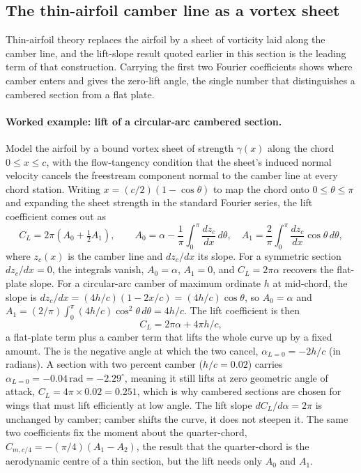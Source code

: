 \subsection{The thin-airfoil camber line as a vortex sheet}

Thin-airfoil theory replaces the airfoil by a sheet of vorticity laid
along the camber line, and the lift-slope result quoted earlier in
this section is the leading term of that construction. Carrying the
first two Fourier coefficients shows where camber enters and gives the
zero-lift angle, the single number that distinguishes a cambered
section from a flat plate.

\paragraph{Worked example: lift of a circular-arc cambered section.}
Model the airfoil by a bound vortex sheet of strength $\gamma(x)$
along the chord $0 \le x \le c$, with the flow-tangency condition that
the sheet's induced normal velocity cancels the freestream component
normal to the camber line at every chord station. Writing $x =
(c/2)(1 - \cos\theta)$ to map the chord onto $0 \le \theta \le \pi$
and expanding the sheet strength in the standard Fourier series, the
lift coefficient comes out as
\[
C_L = 2\pi\left(A_0 + \tfrac12 A_1\right),
\qquad
A_0 = \alpha - \frac{1}{\pi}\int_0^\pi \frac{dz_c}{dx}\,d\theta,
\quad
A_1 = \frac{2}{\pi}\int_0^\pi \frac{dz_c}{dx}\cos\theta\,d\theta,
\]
where $z_c(x)$ is the camber line and $dz_c/dx$ its slope. For a
symmetric section $dz_c/dx = 0$, the integrals vanish, $A_0 = \alpha$,
$A_1 = 0$, and $C_L = 2\pi\alpha$ recovers the flat-plate slope. For a
circular-arc camber of maximum ordinate $h$ at mid-chord, the slope is
$dz_c/dx = (4h/c)(1 - 2x/c) = (4h/c)\cos\theta$, so $A_0 = \alpha$ and
$A_1 = (2/\pi)\int_0^\pi (4h/c)\cos^2\theta\,d\theta = 4h/c$. The lift
coefficient is then
\[
C_L = 2\pi\alpha + 4\pi h/c,
\]
a flat-plate term plus a camber term that lifts the whole curve up by
a fixed amount. The  is the negative angle at
which the two cancel, $\alpha_{L=0} = -2h/c$ (in radians). A section
with two percent camber ($h/c = 0.02$) carries $\alpha_{L=0} =
-0.04\,\text{rad} = -2.29^\circ$, meaning it still lifts at zero
geometric angle of attack, $C_L = 4\pi\times 0.02 = 0.251$, which is
why cambered sections are chosen for wings that must lift efficiently
at low angle. The lift slope $dC_L/d\alpha = 2\pi$ is unchanged by
camber; camber shifts the curve, it does not steepen it. The same two
coefficients fix the moment about the quarter-chord, $C_{m,c/4} =
-(\pi/4)(A_1 - A_2)$, the result that the quarter-chord is the
aerodynamic centre of a thin section, but the lift needs only $A_0$
and $A_1$.

